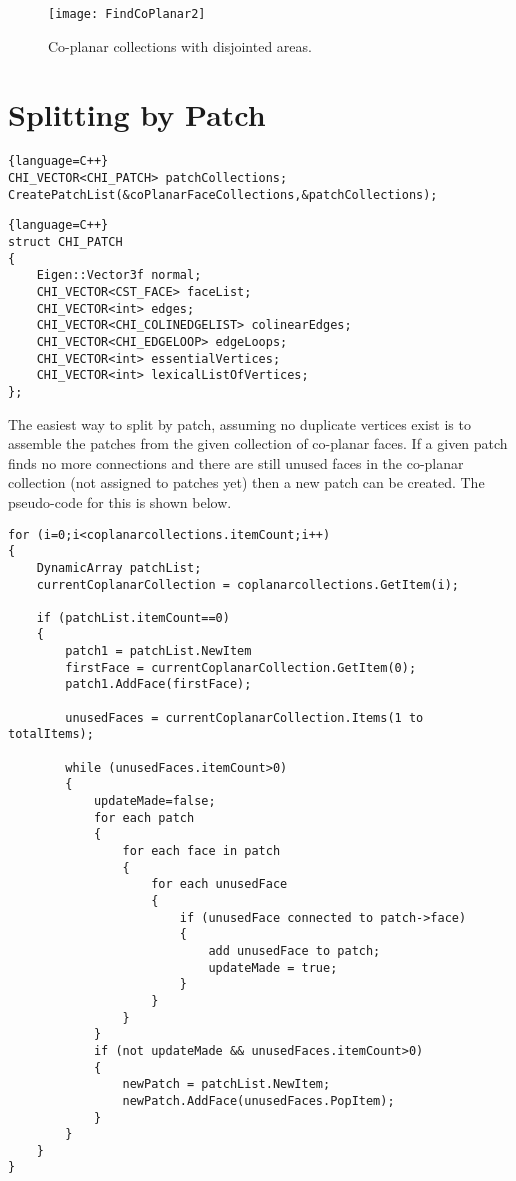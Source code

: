 \documentclass[11pt,letterpaper,titlepage]{article}
\begin{document}
\begin{figure}[H]
    \centering
    \texttt{[image: FindCoPlanar2]}
    \caption{Co-planar collections with disjointed areas.}
    \label{fig:findcoplanar2}
\end{figure}


\vspace{1cm}
\section{Splitting by Patch}
\begin{lstlisting}{language=C++}
CHI_VECTOR<CHI_PATCH> patchCollections;
CreatePatchList(&coPlanarFaceCollections,&patchCollections);
\end{lstlisting}

\vspace{0.5cm}
\begin{lstlisting}{language=C++}
struct CHI_PATCH
{
	Eigen::Vector3f normal;
	CHI_VECTOR<CST_FACE> faceList;
	CHI_VECTOR<int> edges;
	CHI_VECTOR<CHI_COLINEDGELIST> colinearEdges;
	CHI_VECTOR<CHI_EDGELOOP> edgeLoops;
	CHI_VECTOR<int> essentialVertices;
	CHI_VECTOR<int> lexicalListOfVertices;
};
\end{lstlisting}

\noindent
The easiest way to split by patch, assuming no duplicate vertices exist is to assemble the patches from the given collection of co-planar faces. If a given patch finds no more connections and there are still unused faces in the co-planar collection (not assigned to patches yet) then a new patch can be created. The pseudo-code for this is shown below.
\newline

\begin{lstlisting}
for (i=0;i<coplanarcollections.itemCount;i++)
{
	DynamicArray patchList;
	currentCoplanarCollection = coplanarcollections.GetItem(i);
	
	if (patchList.itemCount==0)
	{
		patch1 = patchList.NewItem
		firstFace = currentCoplanarCollection.GetItem(0);
		patch1.AddFace(firstFace);
		
		unusedFaces = currentCoplanarCollection.Items(1 to totalItems);
		
		while (unusedFaces.itemCount>0)
		{
			updateMade=false;
			for each patch
			{
				for each face in patch
				{
					for each unusedFace
					{
						if (unusedFace connected to patch->face)
						{
							add unusedFace to patch;
							updateMade = true;
						}
					}
				}
			}
			if (not updateMade && unusedFaces.itemCount>0)
			{
				newPatch = patchList.NewItem;
				newPatch.AddFace(unusedFaces.PopItem);
			}
		}
	}
}
\end{lstlisting}
\end{document}
